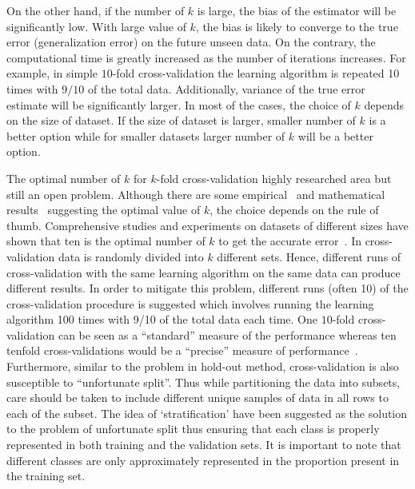 On the other hand, if the number of $k$ is large, the bias of the estimator will be significantly low. With large value of $k$, the bias is likely to converge to the true error (generalization error) on the future unseen data. On the contrary, the computational time is greatly increased as the number of iterations increases. For example, in simple $10$-fold cross-validation the learning algorithm is repeated 10 times with $9/10$ of the total data. Additionally, variance of the true error estimate will be significantly larger. In most of the cases, the choice of $k$ depends on the size of dataset. If the size of dataset is larger, smaller number of $k$ is a better option while for smaller datasets larger number of $k$ will be a better option.

The optimal number of $k$ for $k$-fold cross-validation highly researched area but still an open problem.  Although there are some empirical~\cite{Kohavi95astudy} and mathematical results~\cite{witten} suggesting the optimal value of $k$, the choice depends on the rule of thumb. Comprehensive studies and experiments on datasets of different sizes have shown that ten is the optimal number of $k$ to get the accurate error~\cite{witten}. In cross-validation data is randomly divided into $k$ different sets. Hence, different runs of cross-validation with the same learning algorithm on the same data can produce different results. In order to mitigate this problem, different runs (often 10) of the cross-validation procedure is suggested which involves running the learning algorithm 100 times with 9/10 of the total data each time. One $10$-fold cross-validation can be seen as a ``standard'' measure of the performance whereas ten tenfold cross-validations would be a ``precise'' measure of performance~\cite{kayphdthesis}. Furthermore, similar to the problem in hold-out method, cross-validation is also susceptible to ``unfortunate split''. Thus while partitioning the data into subsets, care should be taken to include different unique samples of data in all rows to each of the subset. The idea of `stratification' have been suggested as the solution to the problem of unfortunate split thus ensuring that each class is properly represented in both training and the validation sets. It is important to note that different classes are only approximately represented in the proportion present in the training set.

